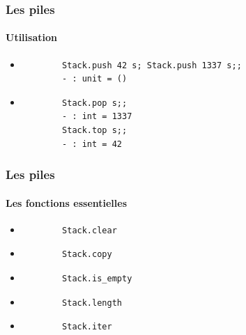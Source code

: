 \begin{frame}[fragile]
\frametitle{Les piles}
\framesubtitle{Utilisation}
	\begin{itemize}
	
	\item
		\begin{lstlisting}
		Stack.push 42 s; Stack.push 1337 s;;
		- : unit = ()	
		\end{lstlisting}	
	
	\item
		\begin{lstlisting}
		Stack.pop s;;
		- : int = 1337
		Stack.top s;;
		- : int = 42
		\end{lstlisting}	

	\end{itemize}

\end{frame}

\begin{frame}[fragile]
	\frametitle{Les piles}
	\framesubtitle{Les fonctions essentielles}
	\begin{itemize}
	
	\item
		\begin{lstlisting}
		Stack.clear
		\end{lstlisting}

	\item
		\begin{lstlisting}
		Stack.copy
		\end{lstlisting}	

	\item
		\begin{lstlisting}
		Stack.is_empty
		\end{lstlisting}	

	\item
		\begin{lstlisting}
		Stack.length
		\end{lstlisting}	

	\item
		\begin{lstlisting}
		Stack.iter
		\end{lstlisting}

	\end{itemize}

\end{frame}

